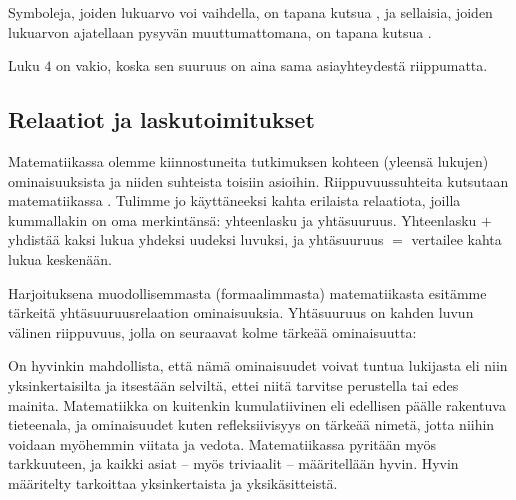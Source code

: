 Symboleja, joiden lukuarvo voi vaihdella, on tapana kutsua , ja sellaisia, joiden lukuarvon ajatellaan pysyvän muuttumattomana, on tapana kutsua .

\begin{esimerkki}
Luku $4$ on vakio, koska sen suuruus on aina sama asiayhteydestä riippumatta.
\end{esimerkki}


\subsection{Relaatiot ja laskutoimitukset}

Matematiikassa olemme kiinnostuneita tutkimuksen kohteen (yleensä lukujen) ominaisuuksista ja niiden suhteista toisiin asioihin. Riippuvuussuhteita kutsutaan matematiikassa . Tulimme jo käyttäneeksi kahta erilaista relaatiota, joilla kummallakin on oma merkintänsä: yhteenlasku ja yhtäsuuruus. Yhteenlasku $+$ yhdistää kaksi lukua yhdeksi uudeksi luvuksi, ja yhtäsuuruus $=$ vertailee kahta lukua keskenään.

Harjoituksena muodollisemmasta (formaalimmasta) matematiikasta esitämme tärkeitä yhtäsuuruusrelaation ominaisuuksia. Yhtäsuuruus on kahden luvun välinen riippuvuus, jolla on seuraavat kolme tärkeää ominaisuutta:


\newpage %
\begin{esimerkki}
\end{esimerkki}

On hyvinkin mahdollista, että nämä ominaisuudet voivat tuntua lukijasta  eli niin yksinkertaisilta ja itsestään selviltä, ettei niitä tarvitse perustella tai edes mainita. Matematiikka on kuitenkin kumulatiivinen eli edellisen päälle rakentuva tieteenala, ja ominaisuudet kuten refleksiivisyys on tärkeää nimetä, jotta niihin voidaan myöhemmin viitata ja vedota. Matematiikassa pyritään myös tarkkuuteen, ja kaikki asiat -- myös triviaalit -- määritellään hyvin. Hyvin määritelty tarkoittaa yksinkertaista ja yksikäsitteistä.

